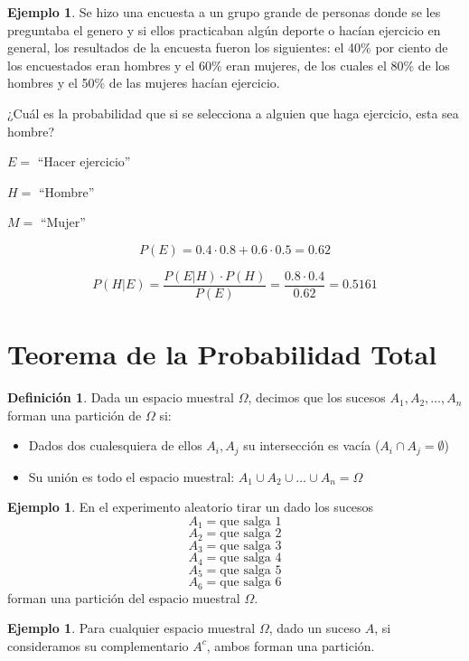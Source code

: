 \documentclass[]{book}
\providecommand{\tightlist}{%
  \setlength{\itemsep}{0pt}\setlength{\parskip}{0pt}}
\theoremstyle{plain}
\theoremstyle{definition}
\newtheorem{definition}[theorem]{Definición}
\newtheorem{example}[theorem]{Ejemplo}
\theoremstyle{definition} %
\begin{document}
\begin{example}
Se hizo una encuesta a un grupo grande de personas donde se les
preguntaba el genero y si ellos practicaban algún deporte o hacían
ejercicio en general, los resultados de la encuesta fueron los
siguientes: el 40\% por ciento de los encuestados eran hombres y el 60\%
eran mujeres, de los cuales el 80\% de los hombres y el 50\% de las
mujeres hacían ejercicio.

¿Cuál es la probabilidad que si se selecciona a alguien que haga
ejercicio, esta sea hombre?

\(E =\) ``Hacer ejercicio''

\(H =\) ``Hombre''

\(M =\) ``Mujer''

\[P(E) = 0.4\cdot 0.8 + 0.6 \cdot 0.5 = 0.62\]

\[P(H|E) = \frac{P(E|H)\cdot P(H)}{P(E)}=\frac{0.8\cdot 0.4}{0.62}=0.5161\]
 
\end{example}



\section{Teorema de la Probabilidad Total} 

\begin{definition}
Dada un espacio muestral \(\Omega\), decimos que
los sucesos \(A_1, A_2, \ldots, A_n\) forman una partición de \(\Omega\)
si:

\begin{itemize}
\tightlist
\item
  Dados dos cualesquiera de ellos \(A_i, A_j\) su intersección es vacía
  (\(A_i\cap A_j = \emptyset\))
\item
  Su unión es todo el espacio muestral:
  \(A_1 \cup A_2 \cup \ldots \cup A_n = \Omega\)
\end{itemize}
\end{definition}


\begin{example}
  En el experimento aleatorio tirar un dado los sucesos
\[A_1 = \text{que salga 1}\] 
\[A_2 = \text{que salga 2}\]
\[A_3 = \text{que salga 3}\] 
\[A_4 = \text{que salga 4}\]
\[A_5 = \text{que salga 5}\] 
\[A_6 = \text{que salga 6}\] 
forman
una partición del espacio muestral \(\Omega\).

\end{example}
 

\begin{example}
  Para cualquier espacio muestral \(\Omega\), dado un suceso \(A\), si
consideramos su complementario \(A^c\), ambos forman una partición.

\end{example}
\end{document}
